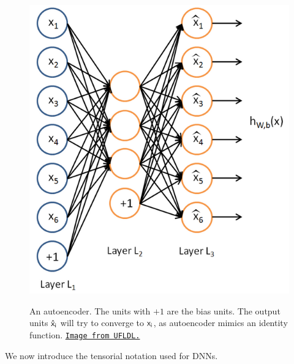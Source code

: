 \documentclass[12pt]{article}  %
\begin{document}
\begin{figure}[ht]
\centering
\includegraphics[scale=0.4]{images/autoencoder.png}\\
\caption{An autoencoder. The units with $+1$ are the bias units. The output units $\sf{\hat{x}_i}$ will try to converge to $\sf{x_i}$, as autoencoder mimics an identity function. \href{http://deeplearning.stanford.edu/wiki/index.php/File:Autoencoder636.png}{\tt Image from UFLDL.}}\label{autoencoder-fig}
\end{figure}


We now introduce the tensorial notation used for DNNs.
\end{document}
